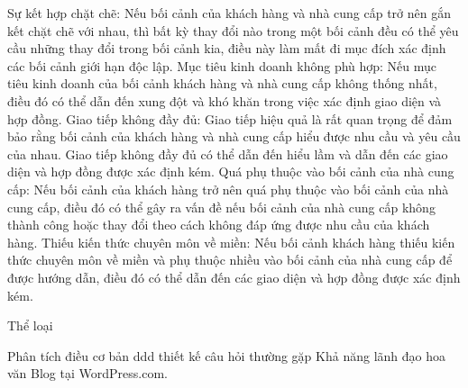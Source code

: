 Sự kết hợp chặt chẽ: Nếu bối cảnh của khách hàng và nhà cung cấp trở nên gắn kết chặt chẽ với nhau, thì bất kỳ thay đổi nào trong một bối cảnh đều có thể yêu cầu những thay đổi trong bối cảnh kia, điều này làm mất đi mục đích xác định các bối cảnh giới hạn độc lập.
Mục tiêu kinh doanh không phù hợp: Nếu mục tiêu kinh doanh của bối cảnh khách hàng và nhà cung cấp không thống nhất, điều đó có thể dẫn đến xung đột và khó khăn trong việc xác định giao diện và hợp đồng.
Giao tiếp không đầy đủ: Giao tiếp hiệu quả là rất quan trọng để đảm bảo rằng bối cảnh của khách hàng và nhà cung cấp hiểu được nhu cầu và yêu cầu của nhau. Giao tiếp không đầy đủ có thể dẫn đến hiểu lầm và dẫn đến các giao diện và hợp đồng được xác định kém.
Quá phụ thuộc vào bối cảnh của nhà cung cấp: Nếu bối cảnh của khách hàng trở nên quá phụ thuộc vào bối cảnh của nhà cung cấp, điều đó có thể gây ra vấn đề nếu bối cảnh của nhà cung cấp không thành công hoặc thay đổi theo cách không đáp ứng được nhu cầu của khách hàng.
Thiếu kiến ​​thức chuyên môn về miền: Nếu bối cảnh khách hàng thiếu kiến ​​thức chuyên môn về miền và phụ thuộc nhiều vào bối cảnh của nhà cung cấp để được hướng dẫn, điều đó có thể dẫn đến các giao diện và hợp đồng được xác định kém.

Thể loại

Phân tích
điều cơ bản
ddd
thiết kế
câu hỏi thường gặp
Khả năng lãnh đạo
hoa văn
Blog tại WordPress.com.


